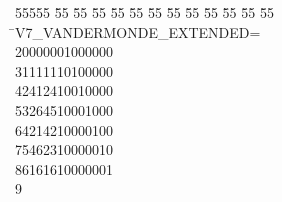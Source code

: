 %
%
\begin{tabbing}
55555 \= 55 \= 55 \= 55 \= 55 \= 55 \= 55 \= 55 \= 55 \= 55 \= 55 \= 55 \= 55 \= \>V7\_VANDERMONDE\_EXTENDED=\\[0pt]
20000001000000\ \\[0pt]
31111110100000\ \\[0pt]
42412410010000\ \\[0pt]
53264510001000\ \\[0pt]
64214210000100\ \\[0pt]
75462310000010\ \\[0pt]
86161610000001\\[0pt]
9\>\end{tabbing}
